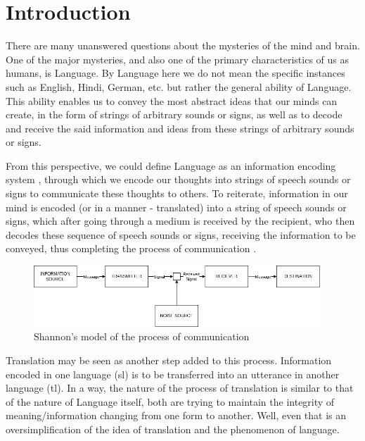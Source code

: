 \chapter{Introduction}

There are many unanswered questions about the mysteries of the mind and brain. One of the major mysteries, and also one of the primary characteristics of us as humans, is Language. By Language here we do not mean the specific instances such as English, Hindi, German, etc. but rather the general ability of Language. This ability enables us to convey the most abstract ideas that our minds can create, in the form of strings of arbitrary sounds or signs, as well as to decode and receive the said information and ideas from these strings of arbitrary sounds or signs.

From this perspective, we could define Language as an information encoding system \cite{coupe2019different}, through which we encode our thoughts into strings of speech sounds or signs to communicate these thoughts to others. To reiterate, information in our mind is encoded (or in a manner - translated) into a string of speech sounds or signs, which after going through a medium is received by the recipient, who then decodes these sequence of speech sounds or signs, receiving the information to be conveyed, thus completing the process of communication \cite{shannon1948mathematical}.

\begin{figure}[h]
    \centering
    \includegraphics[width=0.96\textwidth]{images/InformationProcess.drawio.png}
    \caption{Shannon's model of the process of communication}
\end{figure}

Translation may be seen as another step added to this process. Information encoded in one language (\gls{sl}) is to be transferred into an utterance in another language (\gls{tl}). In a way, the nature of the process of translation is similar to that of the nature of Language itself, both are trying to maintain the integrity of meaning/information changing from one form to another. Well, even that is an oversimplification of the idea of translation and the phenomenon of language.

